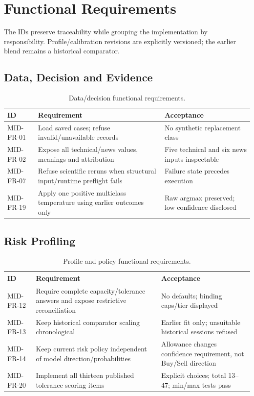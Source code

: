 \section{Functional Requirements}
The IDs preserve traceability while grouping the implementation by responsibility. Profile/calibration revisions are explicitly versioned; the earlier blend remains a historical comparator.
\subsection{Data, Decision and Evidence}
\begin{longtable}{p{}p{}p{}}
\caption{Data/decision functional requirements.}\label{tab:fr-data}\\\toprule ID & Requirement & Acceptance\\\midrule
MID-FR-01 & Load saved cases; refuse invalid/unavailable records & No synthetic replacement class\\
MID-FR-02 & Expose all technical/news values, meanings and attribution & Five technical and six news inputs inspectable\\
MID-FR-07 & Refuse scientific reruns when structural input/runtime preflight fails & Failure state precedes execution\\
MID-FR-19 & Apply one positive multiclass temperature using earlier outcomes only & Raw argmax preserved; low confidence disclosed\\
\bottomrule\end{longtable}
\subsection{Risk Profiling}
\begin{longtable}{p{}p{}p{}}
\caption{Profile and policy functional requirements.}\label{tab:fr-risk}\\\toprule ID & Requirement & Acceptance\\\midrule
MID-FR-12 & Require complete capacity/tolerance answers and expose restrictive reconciliation & No defaults; binding caps/tier displayed\\
MID-FR-13 & Keep historical comparator scaling chronological & Earlier fit only; unsuitable historical sessions refused\\
MID-FR-14 & Keep current risk policy independent of model direction/probabilities & Allowance changes confidence requirement, not Buy/Sell direction\\
MID-FR-20 & Implement all thirteen published tolerance scoring items & Explicit choices; total 13--47; min/max tests pass\\
\bottomrule\end{longtable}
